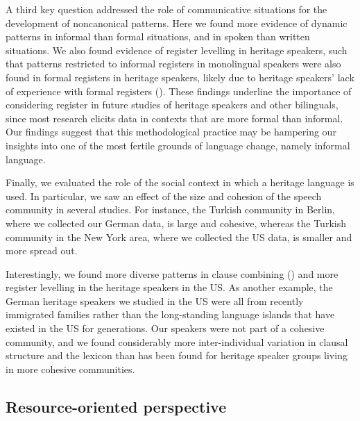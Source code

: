 \documentclass[output=paper,colorlinks,citecolor=brown]{langscibook}
\begin{document}
A third key question addressed the role of communicative situations for the development of noncanonical patterns. Here we found more evidence of dynamic patterns in informal than formal situations, and in spoken than written situations. We also found evidence of register levelling in heritage speakers, such that patterns restricted to informal registers in monolingual speakers were also found in formal registers in heritage speakers, likely due to heritage speakers’ lack of experience with formal registers (\cite{chapters/05, chapters/08, chapters/10, chapters/12, chapters/15}). These findings underline the importance of considering register in future studies of heritage speakers and other bilinguals, since most research elicits data in contexts that are more formal than informal. Our findings suggest that this methodological practice may be hampering our insights into one of the most fertile grounds of language change, namely informal language.

Finally, we evaluated the role of the social context in which a heritage language is used. In particular, we saw an effect of the size and cohesion of the speech community in several studies. For instance, the Turkish community in Berlin, where we collected our German data, is large and cohesive, whereas the Turkish community in the New York area, where we collected the US data, is smaller and more spread out.

Interestingly, we found more diverse patterns in clause combining (\citealt{IefremenkoEtAl2021}) and more register levelling \parencite{chapters/08, chapters/15} in the heritage speakers in the US. As another example, the German heritage speakers we studied in the US were all from recently immigrated families rather than the long\hyp standing language islands that have existed in the US for generations. Our speakers were not part of a cohesive community, and we found considerably more inter-individual variation in clausal structure \parencite{chapters/05} and the lexicon \parencite{chapters/10} than has been found for heritage speaker groups living in more cohesive communities.

\subsection{Resource-oriented perspective} \label{sec:introwieseetal:resource}
\end{document}
